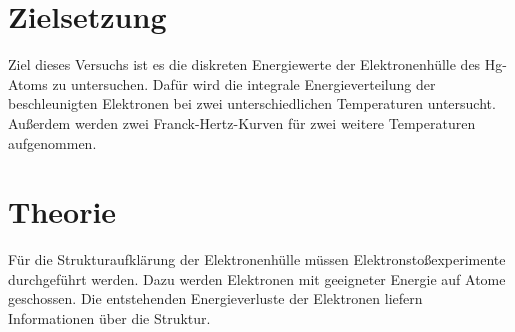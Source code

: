 \section{Zielsetzung}
\label{sec:Zielsetzung}
Ziel dieses Versuchs ist es die diskreten Energiewerte der Elektronenhülle des Hg-Atoms zu untersuchen.
Dafür wird die integrale Energieverteilung der beschleunigten Elektronen bei zwei unterschiedlichen Temperaturen untersucht. 
Außerdem werden zwei Franck-Hertz-Kurven für zwei weitere Temperaturen aufgenommen.

\section{Theorie}
\label{sec:Theorie}
Für die Strukturaufklärung der Elektronenhülle müssen Elektronstoßexperimente durchgeführt werden.
Dazu werden Elektronen mit geeigneter Energie auf Atome geschossen. Die entstehenden Energieverluste der Elektronen liefern Informationen über die
Struktur.

